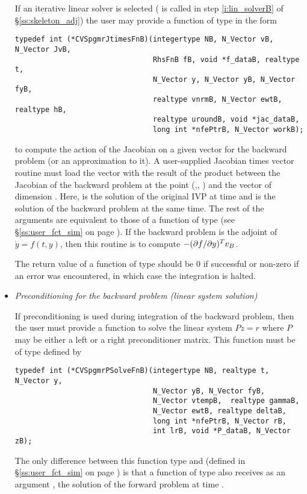 \begin{itemize}
  If an iterative {\spgmr} linear solver is selected ( is called in step 
  \ref{i:lin_solverB} of \S\ref{ss:skeleton_adj}) the user may provide a function
  of type  in the form 
\begin{verbatim}
typedef int (*CVSpgmrJtimesFnB)(integertype NB, N_Vector vB, N_Vector JvB, 
                                RhsFnB fB, void *f_dataB, realtype t, 
                                N_Vector y, N_Vector yB, N_Vector fyB,
                                realtype vnrmB, N_Vector ewtB, realtype hB, 
                                realtype uroundB, void *jac_dataB, 
                                long int *nfePtrB, N_Vector workB);
\end{verbatim}
  to compute the action of the Jacobian on a given vector  for
  the backward problem (or an approximation to it).
  A user-supplied Jacobian times vector routine must load the vector 
  with the result of the product between the Jacobian of the backward problem 
  at the point (,, ) and the vector  of dimension 
  . Here,  is the solution of the original IVP at time  and 
   is the solution of the backward problem at the same time.  
  The rest of the arguments are equivalent to those of a function of type
   (see \S\ref{ss:user_fct_sim} on page \pageref{p:jtimes}).
  If the backward problem is the adjoint of ${\dot y} = f(t, y)$, then this 
  routine is to compute $-(\partial f / \partial y)^T v_B$.

  The return value of a function of type  should be
  $0$ if successful or non-zero if an error was encountered, in which case
  the integration is halted.

\item {\em Preconditioning for the backward problem
    (linear system solution)}

  If preconditioning is used during integration of the backward problem, 
  then the user must provide a {\C} function to solve the linear system 
  $Pz = r$ where $P$ may be either a left or a right preconditioner matrix.
  This function must be of type  defined by
\begin{verbatim}
typedef int (*CVSpgmrPSolveFnB)(integertype NB, realtype t, N_Vector y, 
                                N_Vector yB, N_Vector fyB, 
                                N_Vector vtempB,  realtype gammaB, 
                                N_Vector ewtB, realtype deltaB, 
                                long int *nfePtrB, N_Vector rB, 
                                int lrB, void *P_dataB, N_Vector zB);
\end{verbatim}
  The only difference between this function type and 
  (defined in \S\ref{ss:user_fct_sim} on page \pageref{p:psolve}) is that
  a function of type  also receives as an argument
  , the solution of the forward problem at time .


\end{itemize}
